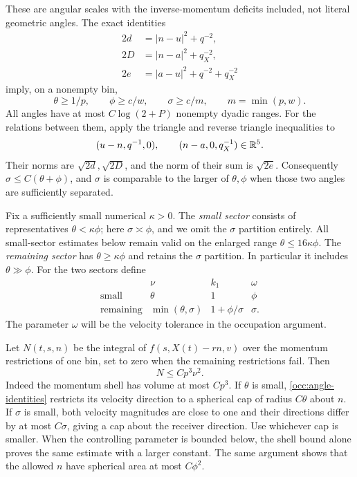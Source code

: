 These are angular scales with the inverse-momentum deficits included,
not literal geometric angles. The exact identities
\begin{equation}\label{occ:angle-identities}
 \begin{split}
 2d&=|n-u|^2+q^{-2},\\
 2D&=|n-a|^2+q_X^{-2},\\
 2e&=|a-u|^2+q^{-2}+q_X^{-2}
 \end{split}
\end{equation}
imply, on a nonempty bin,
\begin{equation}\label{occ:angle-ranges}
 \theta\geq1/p,\qquad \phi\geq c/w,\qquad
 \sigma\geq c/m,\qquad m=\min(p,w).
\end{equation}
All angles have at most $C\log(2+P)$ nonempty dyadic ranges.
For the relations between them, apply the triangle and reverse triangle
inequalities to
\[
 (u-n,q^{-1},0),\qquad(n-a,0,q_X^{-1})\in\mathbb R^5.
\]
Their norms are $\sqrt{2d},\sqrt{2D}$, and the norm of their sum is
$\sqrt{2e}$. Consequently $\sigma\leq C(\theta+\phi)$, and $\sigma$
is comparable to the larger of $\theta,\phi$ when those two angles are
sufficiently separated.

Fix a sufficiently small numerical $\kappa>0$.
The \emph{small sector} consists of representatives
$\theta<\kappa\phi$; here $\sigma\asymp\phi$, and we omit the
$\sigma$ partition entirely. All small-sector estimates below remain
valid on the enlarged range $\theta\leq16\kappa\phi$.
The \emph{remaining sector} has $\theta\geq\kappa\phi$
and retains the $\sigma$ partition. In particular it includes
$\theta\gg\phi$.
For the two sectors define
\begin{equation}\label{occ:sector-parameters}
 \begin{array}{c|c|c|c}
  &\nu&k_1&\omega\\ \hline
 \text{small}&\theta&1&\phi\\
 \text{remaining}&\min(\theta,\sigma)&1+\phi/\sigma&\sigma .
 \end{array}
\end{equation}
The parameter $\omega$ will be the velocity tolerance in the
occupation argument.

Let $N(t,s,n)$ be the integral of $f(s,X(t)-rn,v)$ over the momentum
restrictions of one bin, set to zero when the remaining restrictions
fail. Then
\begin{equation}\label{occ:density}
 N\leq C p^3\nu^2.
\end{equation}
Indeed the momentum shell has volume at most $Cp^3$. If $\theta$ is
small, \eqref{occ:angle-identities} restricts its velocity direction to a
spherical cap of radius $C\theta$ about $n$. If $\sigma$ is small,
both velocity magnitudes are close to one and their directions differ
by at most $C\sigma$, giving a cap about the receiver direction.
Use whichever cap is smaller. When the controlling parameter is bounded
below, the shell bound alone proves the same estimate with a larger
constant. The same argument shows that the allowed $n$ have spherical
area at most $C\phi^2$.


